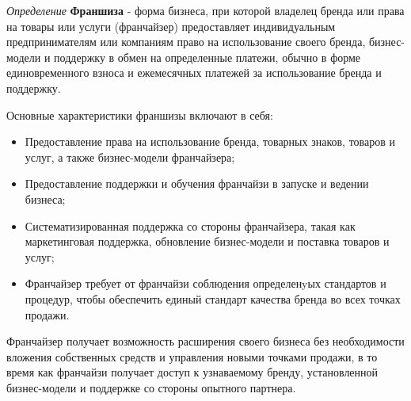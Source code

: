 \textit{Определение} \textbf{Франшиза} -  форма бизнеса, при которой владелец бренда или права на товары или услуги (франчайзер) предоставляет индивидуальным предпринимателям или компаниям  право на использование своего бренда, бизнес-модели и поддержку в обмен на определенные платежи, обычно в форме единовременного взноса и ежемесячных платежей  за использование бренда и поддержку. \cite{caves2014franchising}

Основные характеристики франшизы включают в себя:
\begin{itemize}
    \item Предоставление права на использование бренда, товарных знаков, товаров и услуг, а также бизнес-модели франчайзера; 
    \item Предоставление поддержки и обучения франчайзи в запуске и ведении бизнеса;
    \item Систематизированная поддержка со стороны франчайзера, такая как маркетинговая поддержка, обновление бизнес-модели и поставка товаров и услуг;
    \item Франчайзер требует от франчайзи соблюдения определенyых стандартов и процедур, чтобы обеспечить единый стандарт качества бренда во всех точках продажи.
\end{itemize}

Франчайзер получает возможность расширения своего бизнеса без необходимости вложения собственных средств и управления новыми точками продажи, в то время как франчайзи получает доступ к узнаваемому бренду, установленной бизнес-модели и поддержке со стороны опытного партнера.
